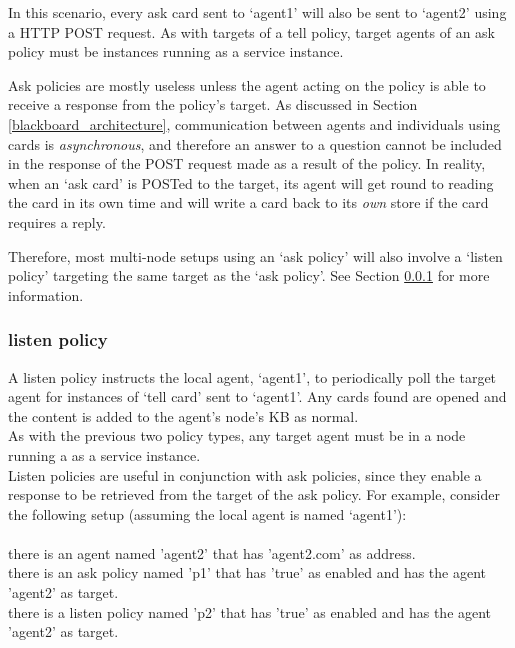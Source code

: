 \documentclass{scrartcl}
\newcommand{\ce}[1]{\textsf{#1}}
\begin{document}
In this scenario, every \ce{ask card} sent to `agent1' will also be sent to `agent2' using a HTTP POST request. As with targets of a \ce{tell policy}, target agents of an \ce{ask policy} must be instances running as a service instance.

Ask policies are mostly useless unless the agent acting on the policy is able to receive a response from the policy's target. As discussed in Section \ref{blackboard_architecture}, communication between agents and individuals using cards is \textit{asynchronous}, and therefore an answer to a question cannot be included in the response of the POST request made as a result of the policy. In reality, when an `ask card' is POSTed to the target, its agent will get round to reading the card in its own time and will write a card back to its \textit{own} store if the card requires a reply.

Therefore, most multi-node setups using an `ask policy' will also involve a `listen policy' targeting the same target as the `ask policy'. See Section \ref{listen_policy} for more information.

\subsubsection{\ce{listen policy}}
\label{listen_policy}
A \ce{listen policy} instructs the local agent, `agent1', to periodically poll the target agent for instances of `tell card' sent to `agent1'. Any cards found are opened and the content is added to the agent's node's KB as normal.\\

As with the previous two policy types, any target agent must be in a node running a as a service instance.\\

Listen policies are useful in conjunction with ask policies, since they enable a response to be retrieved from the target of the ask policy. For example, consider the following setup (assuming the local agent is named `agent1'):\\
\\\ce{there is an agent named 'agent2' that has 'agent2.com' as address.\\
there is an ask policy named 'p1' that has 'true' as enabled and has the agent 'agent2' as target.\\
there is a listen policy named 'p2' that has 'true' as enabled and has the agent 'agent2' as target.}\\
\end{document}
